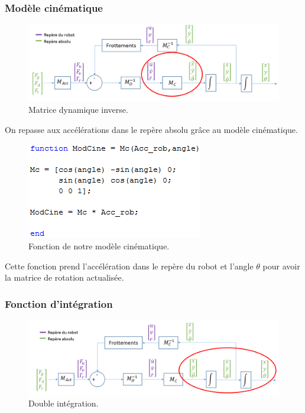\documentclass[a4paper,10pt]{article}
\begin{document}
\subsubsection{Modèle cinématique}
\begin{figure}[H]
\bigcenter\includegraphics[scale=0.5]{images/modelecinematique.png}
\caption{Matrice dynamique inverse.}
\end{figure}

On repasse aux accélérations dans le repère absolu grâce au modèle cinématique. 

\begin{figure}[H]
\bigcenter\includegraphics[scale=0.8]{images/cinematique.png}
\caption{Fonction de notre modèle cinématique.}
\end{figure}

Cette fonction prend l’accélération dans le repère du robot et l’angle $\theta$ pour avoir la matrice de rotation actualisée.

\subsubsection{Fonction d'intégration}
\begin{figure}[H]
\bigcenter\includegraphics[scale=0.5]{images/integration.png}
\caption{Double intégration.}
\end{figure}
\end{document}
